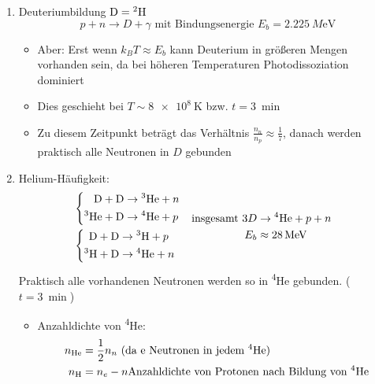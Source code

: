 \begin{enumerate}[label={$(\arabic*)$}]
	\item Deuteriumbildung $\text{D}=\text{\textsuperscript{2}H}$
		\begin{equation*}
			p+n\to D+\gamma \text{ mit Bindungsenergie $E_b=\SI{2.225}{M\eV}$}
		\end{equation*}
		\begin{itemize}
			\item Aber: Erst wenn $k_BT\approx E_b$ kann Deuterium in größeren Mengen vorhanden sein, da bei höheren Temperaturen Photodissoziation dominiert
			\item Dies geschieht bei $T\sim \SI{8e8}{\K}$ bzw. $t=\SI{3}{\min}$
			\item Zu diesem Zeitpunkt beträgt das Verhältnis $\frac{n_n}{n_p}\approx\frac{1}{7}$, danach werden praktisch alle Neutronen in $D$ gebunden
		\end{itemize}
	\item Helium-Häufigkeit:
		\begin{align*}
			&\begin{aligned}&\left\{\begin{aligned}\text{D}+\text{D}&\to\text{\textsuperscript{3}He}+n\\
			\text{\textsuperscript{3}He}+\text{D}&\to\text{\textsuperscript{4}He}+p\end{aligned}\right.\\
			&\left\{\begin{aligned}\text{D}+\text{D}&\to\text{\textsuperscript{3}H}+p\\
			\text{\textsuperscript{3}H}+\text{D}&\to\text{\textsuperscript{4}He}+n\end{aligned}\right.\end{aligned} & &\begin{aligned}\text{insgesamt } 3D&\to\text{\textsuperscript{4}He}+p+n \\ E_b&\approx\SI{28}{M\eV}\end{aligned}
		\end{align*}
		Praktisch alle vorhandenen Neutronen werden so in \textsuperscript{4}He gebunden. ($t=\SI{3}{\min}$)
		\begin{itemize}
			\item Anzahldichte von \textsuperscript{4}He:
				\begin{align*}
					n_\text{He}&=\frac{1}{2}n_n \text{ (da e Neutronen in jedem \textsuperscript{4}He)}\\
					n_\text{H}&=n_e-n \text{Anzahldichte von Protonen nach Bildung von \textsuperscript{4}He}

\end{align*}
\end{itemize}
\end{enumerate}
